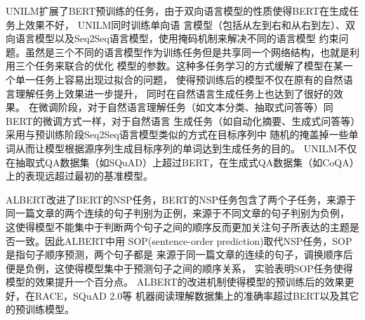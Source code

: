 UNILM扩展了BERT预训练的任务，由于双向语言模型的性质使得BERT在生成任务上效果不好，
UNILM同时训练单向语
言模型（包括从左到右和从右到左）、双向语言模型以及Seq2Seq语言模型，使用掩码机制来解决不同的语言模型
约束问题。虽然是三个不同的语言模型作为训练任务但是共享同一个网络结构，也就是利用三个任务来联合的优化
模型的参数。这种多任务学习的方式缓解了模型在某一个单一任务上容易出现过拟合的问题，
使得预训练后的模型不仅在原有的自然语言理解任务上效果进一步提升，
同时在自然语言生成任务上也达到了很好的效果。
在微调阶段，对于自然语言理解任务（如文本分类、抽取式问答等）同BERT的微调方式一样，对于自然语言
生成任务（如自动化摘要、生成式问答等）采用与预训练阶段Seq2Seq语言模型类似的方式在目标序列中
随机的掩盖掉一些单词从而让模型根据源序列生成目标序列的单词达到生成任务的目的。
UNILM不仅在抽取式QA数据集（如SQuAD）上超过BERT，在生成式QA数据集（如CoQA）上的表现远超过最初的基准模型。



ALBERT改进了BERT的NSP任务，BERT的NSP任务包含了两个子任务，来源于同一篇文章的两个连续的句子判别为正例，来源于不同文章的句子判别为负例，
这使得模型不能集中于判断两个句子之间的顺序反而更加关注句子所表达的主题是否一致。因此ALBERT中用
SOP(sentence-order prediction)取代NSP任务，SOP是指句子顺序预测，两个句子都是
来源于同一篇文章的连续的句子，调换顺序后便是负例，这使得模型集中于预测句子之间的顺序关系，
实验表明SOP任务使得模型的效果提升一个百分点。
ALBERT的改进机制使得模型的预训练后的效果更好，在RACE，SQuAD 2.0等
机器阅读理解数据集上的准确率超过BERT以及其它的预训练模型。

